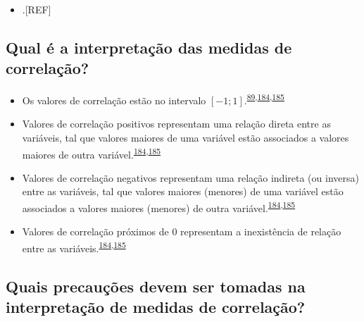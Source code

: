 \documentclass[
  a4paper,
]{book}
\providecommand{\tightlist}{%
  \setlength{\itemsep}{0pt}\setlength{\parskip}{0pt}}
\begin{document}
\begin{itemize}
\tightlist
\item
  .{[}REF{]}
\end{itemize}

\hypertarget{qual-uxe9-a-interpretauxe7uxe3o-das-medidas-de-correlauxe7uxe3o}{%
\subsection{Qual é a interpretação das medidas de correlação?}\label{qual-uxe9-a-interpretauxe7uxe3o-das-medidas-de-correlauxe7uxe3o}}

\begin{itemize}
\item
  Os valores de correlação estão no intervalo \([-1; 1]\).\textsuperscript{\protect\hyperlink{ref-barkan2015}{89},\protect\hyperlink{ref-khamis2008}{184},\protect\hyperlink{ref-allison2022}{185}}
\item
  Valores de correlação positivos representam uma relação direta entre as variáveis, tal que valores maiores de uma variável estão associados a valores maiores de outra variável.\textsuperscript{\protect\hyperlink{ref-khamis2008}{184},\protect\hyperlink{ref-allison2022}{185}}
\item
  Valores de correlação negativos representam uma relação indireta (ou inversa) entre as variáveis, tal que valores maiores (menores) de uma variável estão associados a valores maiores (menores) de outra variável.\textsuperscript{\protect\hyperlink{ref-khamis2008}{184},\protect\hyperlink{ref-allison2022}{185}}
\item
  Valores de correlação próximos de \(0\) representam a inexistência de relação entre as variáveis.\textsuperscript{\protect\hyperlink{ref-khamis2008}{184},\protect\hyperlink{ref-allison2022}{185}}
\end{itemize}

\hypertarget{quais-precauuxe7uxf5es-devem-ser-tomadas-na-interpretauxe7uxe3o-de-medidas-de-correlauxe7uxe3o}{%
\subsection{Quais precauções devem ser tomadas na interpretação de medidas de correlação?}\label{quais-precauuxe7uxf5es-devem-ser-tomadas-na-interpretauxe7uxe3o-de-medidas-de-correlauxe7uxe3o}}
\end{document}
